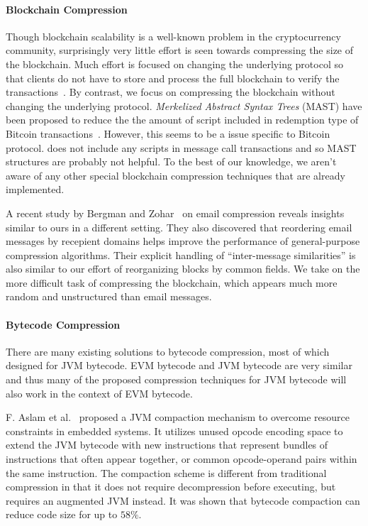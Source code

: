 \paragraph{Blockchain Compression}
Though blockchain scalability is a well-known problem in the cryptocurrency community,
surprisingly very little effort is seen towards compressing the size of the blockchain.
Much effort is focused on changing the underlying protocol so that clients
do not have to store and process the full blockchain to verify the transactions~\cite{lightclient, ultimate}.
By contrast, we focus on compressing the blockchain without changing the underlying protocol.
\emph{Merkelized Abstract Syntax Trees} (MAST) have been proposed to reduce the the amount of script included in redemption
type of Bitcoin transactions~\cite{mast}. 
However, this seems to be a issue specific to Bitcoin protocol.  
\eth{} does not include any scripts in message call transactions and so  MAST structures are probably not helpful.
To the best of our knowledge, we aren't aware of any other special blockchain compression techniques that are already implemented. 

A recent study by Bergman and Zohar~\cite{bergman2015compressing} on email compression
reveals insights similar to ours in a different setting.
They also discovered that reordering email messages by recepient domains helps improve
the performance of general-purpose compression algorithms.
Their explicit handling of ``inter-message similarities'' is also similar to our effort of reorganizing blocks by common fields.
We take on the more difficult task of compressing the \eth{} blockchain,
which appears much more random and unstructured than email messages.

\paragraph{Bytecode Compression}
There are many existing solutions to bytecode compression, most of which designed for JVM bytecode.
EVM bytecode and JVM bytecode are very similar and thus many of the proposed compression techniques for JVM bytecode
will also work in the context of EVM bytecode.

F. Aslam et al.~\cite{aslam2010} proposed a JVM compaction mechanism to overcome resource constraints in embedded systems.
It utilizes unused opcode encoding space to extend the JVM bytecode with new instructions that represent bundles of
instructions that often appear together, or common opcode-operand pairs within the same instruction.
The compaction scheme is different from traditional compression in that it does not require decompression before executing,
but requires an augmented JVM instead. It was shown that bytecode compaction can reduce code size for up to $58\%$.

